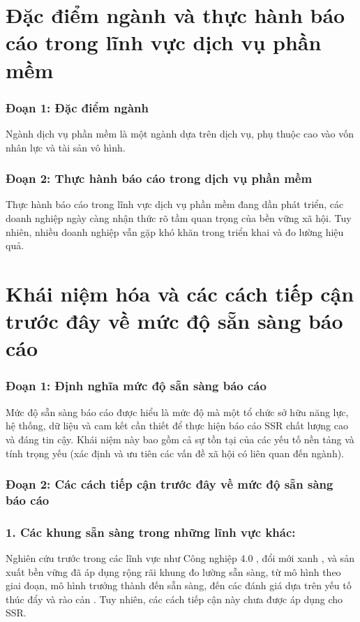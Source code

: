 \section{Đặc điểm ngành và thực hành báo cáo trong lĩnh vực dịch vụ phần mềm}

\subsubsection{Đoạn 1: Đặc điểm ngành}

Ngành dịch vụ phần mềm là một ngành dựa trên dịch vụ, phụ thuộc cao vào vốn nhân lực và tài sản vô hình.

\subsubsection{Đoạn 2: Thực hành báo cáo trong dịch vụ phần mềm}

Thực hành báo cáo trong lĩnh vực dịch vụ phần mềm đang dần phát triển, các doanh nghiệp ngày càng nhận thức rõ tầm quan trọng của bền vững xã hội. Tuy nhiên, nhiều doanh nghiệp vẫn gặp khó khăn trong triển khai và đo lường hiệu quả.

\section{Khái niệm hóa và các cách tiếp cận trước đây về mức độ sẵn sàng báo cáo}

\subsubsection{Đoạn 1: Định nghĩa mức độ sẵn sàng báo cáo}

Mức độ sẵn sàng báo cáo được hiểu là mức độ mà một tổ chức sở hữu năng lực, hệ thống, dữ liệu và cam kết cần thiết để thực hiện báo cáo SSR chất lượng cao và đáng tin cậy.
Khái niệm này bao gồm cả sự tồn tại của các yếu tố nền tảng và tính trọng yếu (xác định và ưu tiên các vấn đề xã hội có liên quan đến ngành).

\subsubsection{Đoạn 2: Các cách tiếp cận trước đây về mức độ sẵn sàng báo cáo}

\subsubsection{1. Các khung sẵn sàng trong những lĩnh vực khác:}
Nghiên cứu trước trong các lĩnh vực như Công nghiệp 4.0 \parencite{ElBaz2022}, đổi mới xanh \parencite{Zhang2020}, và sản xuất bền vững \parencite{Barletta2021} đã áp dụng rộng rãi khung đo lường sẵn sàng, từ mô hình theo giai đoạn, mô hình trưởng thành đến sẵn sàng, đến các đánh giá dựa trên yếu tố thúc đẩy và rào cản \parencite{Govindan2023}. Tuy nhiên, các cách tiếp cận này chưa được áp dụng cho SSR.

